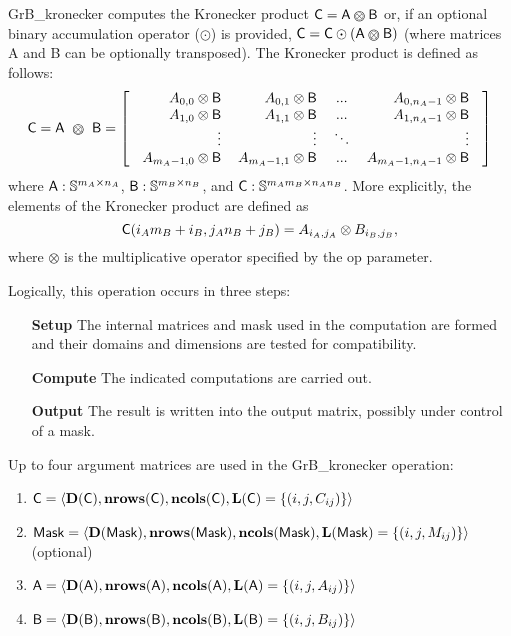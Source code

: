 {\sf GrB\_kronecker} computes the Kronecker product ${\sf C} = {\sf
A} \kron {\sf B}$ or, if an optional binary accumulation
operator ($\odot$) is provided, ${\sf C} = {\sf C} \odot
\left({\sf A} \kron {\sf B}\right)$ (where matrices {\sf A}
and {\sf B} can be optionally transposed).  The Kronecker product is defined as
follows: \\
\[
    {\sf C} = {\sf A} ~ \kron ~ {\sf B} = \left[
    \text{
    \begin{tabular}{rrcr}
        $A_{0,0} \otimes {\sf B}$ & $A_{0,1} \otimes {\sf B}$ & ... & $A_{0,n_A-1} \otimes {\sf B}$ \\
        $A_{1,0} \otimes {\sf B}$ & $A_{1,1} \otimes {\sf B}$ & ... & $A_{1,n_A-1} \otimes {\sf B}$ \\
        $\vdots$ & $\vdots$ & $\ddots$ & $\vdots$ \\
        $A_{m_A-1,0} \otimes {\sf B}$ & $A_{m_A-1,1} \otimes {\sf B}$ & ... & $A_{m_A-1,n_A-1} \otimes {\sf B}$ \\
    \end{tabular}
    }
    \right]
\]
where ${\sf A} : {\mathbb S}^{m_A \times n_A}$, ${\sf B} : {\mathbb S}^{m_B \times n_B}$, and
${\sf C} : {\mathbb S}^{m_A m_B \times n_A n_B}$.  More explicitly, the elements of
the Kronecker product are defined as
\[
    {\sf C}(i_A m_B + i_B, j_A n_B + j_B) = A_{i_A,j_A} \otimes B_{i_B,j_B},
\]
where $\otimes$ is the multiplicative operator specified by the {\sf op} parameter.

Logically, this operation
occurs in three steps:
\begin{enumerate}[leftmargin=0.85in]
\item[\bf Setup] The internal matrices and mask used in the computation are formed and their 
domains and dimensions are tested for compatibility.
\item[\bf Compute] The indicated computations are carried out.
\item[\bf Output] The result is written into the output matrix, possibly under control of a mask.
\end{enumerate}

Up to four argument matrices are used in the {\sf GrB\_kronecker} operation:
\begin{enumerate}
	\item ${\sf C} = \langle \bold{D}({\sf C}),\bold{nrows}({\sf C}),\bold{ncols}({\sf C}),\bold{L}({\sf C}) = \{(i,j,C_{ij}) \} \rangle$
	\item ${\sf Mask} = \langle \bold{D}({\sf Mask}),\bold{nrows}({\sf Mask}),\bold{ncols}({\sf Mask}),\bold{L}({\sf Mask}) = \{(i,j,M_{ij}) \} \rangle$ (optional)
	\item ${\sf A} = \langle \bold{D}({\sf A}),\bold{nrows}({\sf A}), \bold{ncols}({\sf A}),\bold{L}({\sf A}) = \{(i,j,A_{ij}) \} \rangle$
	\item ${\sf B} = \langle \bold{D}({\sf B}),\bold{nrows}({\sf B}), \bold{ncols}({\sf B}),\bold{L}({\sf B}) = \{(i,j,B_{ij}) \} \rangle$
\end{enumerate}

